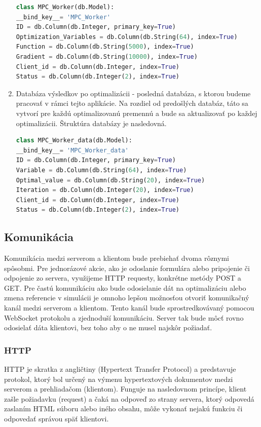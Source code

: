 \begin{enumerate}
{\begin{lstlisting}[language=Python]
class MPC_Worker(db.Model):
__bind_key__= 'MPC_Worker'
ID = db.Column(db.Integer, primary_key=True)
Optimization_Variables = db.Column(db.String(64), index=True)
Function = db.Column(db.String(5000), index=True)
Gradient = db.Column(db.String(10000), index=True)
Client_id = db.Column(db.Integer, index=True)
Status = db.Column(db.Integer(2), index=True)
\end{lstlisting}
}
\label{DB:WORKER_DATA}
\item{ Databáza výsledkov po optimalizácii - posledná databáza, s ktorou budeme pracovať v rámci tejto aplikácie. Na rozdiel od predošlých databáz, táto sa vytvorí pre každú optimalizovanú premennú a bude sa aktualizovať po každej optimalizácii. Štruktúra databázy je nasledovná.
\begin{lstlisting}[language=Python]
class MPC_Worker_data(db.Model):
__bind_key__= 'MPC_Worker_data'
ID = db.Column(db.Integer, primary_key=True)
Variable = db.Column(db.String(64), index=True)
Optimal_value = db.Column(db.String(20), index=True)
Iteration = db.Column(db.Integer(20), index=True)
Client_id = db.Column(db.Integer, index=True)
Status = db.Column(db.Integer(2), index=True)
\end{lstlisting}
}
\end{enumerate}

\subsection{Komunikácia}
Komunikácia medzi serverom a klientom bude prebiehať dvoma rôznymi spôsobmi. Pre jednorázové akcie, ako je odoslanie formulára alebo pripojenie či odpojenie zo servera, využijeme HTTP requesty, konkrétne metódy POST a GET. Pre častú komunikáciu ako bude odosielanie dát na optimalizáciu alebo zmena referencie v simulácii je omnoho lepšou možnosťou otvoriť komunikačný kanál medzi serverom a klientom. Tento kanál bude sprostredkovávaný pomocou WebSocket protokolu a zjednoduší komunikáciu. Server tak bude môcť rovno odosielať dáta klientovi, bez toho aby o ne musel najskôr požiadať. 

\subsubsection{HTTP}
HTTP je skratka z angličtiny (Hypertext Transfer Protocol) a predstavuje protokol, ktorý bol určený na výmenu hypertextových dokumentov medzi serverom a prehliadačom (klientom). Funguje na nasledovnom princípe, klient zašle požiadavku (request) a čaká na odpoveď zo strany servera, ktorý odpovedá zaslaním HTML súboru alebo iného obsahu, môže vykonať nejakú funkciu či odpovedať správou späť klientovi. 

